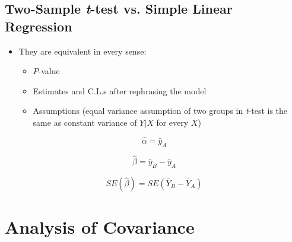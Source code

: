 \documentclass[14pt]{extarticle}
\begin{document}
\subsection*{Two-Sample \textit{t}-test vs. Simple Linear Regression}

\begin{itemize}
    \item They are equivalent in every sense:
    \begin{itemize}
        \item $P$-value
        \item Estimates and C.L.s after rephrasing the model
        \item Assumptions (equal variance assumption of two groups in \textit{t}-test is the same as constant variance of $Y|X$ for every $X$)
    \end{itemize}
\end{itemize}
\[
\hat{\alpha} = \bar{y}_A
\]

\[
\hat{\beta} = \bar{y}_B - \bar{y}_A
\]

\[
SE(\hat{\beta}) = SE\left( \bar{Y}_B - \bar{Y}_A \right)
\]

\section*{Analysis of Covariance}
\end{document}
